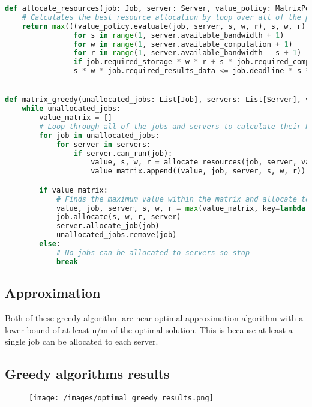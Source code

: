 \begin{lstlisting}[language=Python]
def allocate_resources(job: Job, server: Server, value_policy: MatrixPolicy):
    # Calculates the best resource allocation by loop over all of the possible allocations that satisfy the deadline constraint
    return max(((value_policy.evaluate(job, server, s, w, r), s, w, r)
                for s in range(1, server.available_bandwidth + 1)
                for w in range(1, server.available_computation + 1)
                for r in range(1, server.available_bandwidth - s + 1)
                if job.required_storage * w * r + s * job.required_computation * r +
                s * w * job.required_results_data <= job.deadline * s * w * r), key=lambda x: x[0])


def matrix_greedy(unallocated_jobs: List[Job], servers: List[Server], value_policy: MatrixPolicy):
    while unallocated_jobs:
        value_matrix = []
        # Loop through all of the jobs and servers to calculate their best resource allocation
        for job in unallocated_jobs:
            for server in servers:
                if server.can_run(job):
                    value, s, w, r = allocate_resources(job, server, value_policy)
                    value_matrix.append((value, job, server, s, w, r))

        if value_matrix:
            # Finds the maximum value within the matrix and allocate to job and server
            value, job, server, s, w, r = max(value_matrix, key=lambda x: x[0])
            job.allocate(s, w, r, server)
            server.allocate_job(job)
            unallocated_jobs.remove(job)
        else:
            # No jobs can be allocated to servers so stop
            break
\end{lstlisting}

\subsection{Approximation}\label{subsec:approximation}
Both of these greedy algorithm are near optimal approximation algorithm with a lower bound of at least n/m of the
optimal solution. This is because at least a single job can be allocated to each server.

\subsection{Greedy algorithms results}\label{subsec:greedy-algorithms-results}
\begin{figure}
\centering
    \texttt{[image: /images/optimal\_greedy\_results.png]}
\end{figure}
